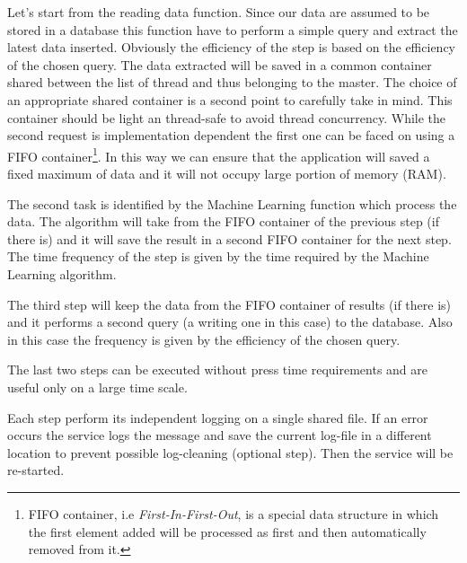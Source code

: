 \documentclass{standalone}
\begin{document}
Let's start from the reading data function.
Since our data are assumed to be stored in a database this function have to perform a simple query and extract the latest data inserted.
Obviously the efficiency of the step is based on the efficiency of the chosen query.
The data extracted will be saved in a common container shared between the list of thread and thus belonging to the master.
The choice of an appropriate shared container is a second point to carefully take in mind.
This container should be light an thread-safe to avoid thread concurrency.
While the second request is implementation dependent the first one can be faced on using a \textsf{FIFO} container\footnote{
  FIFO container, i.e \emph{First-In-First-Out}, is a special data structure in which the first element added will be processed as first and then automatically removed from it.
}.
In this way we can ensure that the application will saved a fixed maximum of data and it will not occupy large portion of memory (RAM).

The second task is identified by the Machine Learning function which process the data.
The algorithm will take from the FIFO container of the previous step (if there is) and it will save the result in a second FIFO container for the next step.
The time frequency of the step is given by the time required by the Machine Learning algorithm.

The third step will keep the data from the FIFO container of results (if there is) and it performs a second query (a writing one in this case) to the database.
Also in this case the frequency is given by the efficiency of the chosen query.

The last two steps can be executed without press time requirements and are useful only on a large time scale.

Each step perform its independent logging on a single shared file.
If an error occurs the service logs the message and save the current log-file in a different location to prevent possible log-cleaning (optional step).
Then the service will be re-started.

% 

\end{document}
